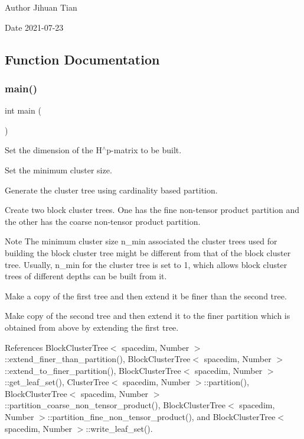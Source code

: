 \begin{DoxyAuthor}{Author}
Jihuan Tian 
\end{DoxyAuthor}
\begin{DoxyDate}{Date}
2021-\/07-\/23 
\end{DoxyDate}


\subsection{Function Documentation}
\mbox{\label{bct-extend-to-finer-partition_8cc_ae66f6b31b5ad750f1fe042a706a4e3d4}} 
\subsubsection{\texorpdfstring{main()}{main()}}
{\footnotesize\ttfamily int main (\begin{DoxyParamCaption}{ }\end{DoxyParamCaption})}

Set the dimension of the H$^\wedge$p-\/matrix to be built.

Set the minimum cluster size.

Generate the cluster tree using cardinality based partition.

Create two block cluster trees. One has the fine non-\/tensor product partition and the other has the coarse non-\/tensor product partition.


\begin{DoxyDescription}
\item[Note ]The minimum cluster size {\ttfamily n\+\_\+min} associated the cluster trees used for building the block cluster tree might be different from that of the block cluster tree. Usually, {\ttfamily n\+\_\+min} for the cluster tree is set to 1, which allows block cluster trees of different depths can be built from it. 
\end{DoxyDescription}

Make a copy of the first tree and then extend it be finer than the second tree.

Make copy of the second tree and then extend it to the finer partition which is obtained from above by extending the first tree.

References Block\+Cluster\+Tree$<$ spacedim, Number $>$\+::extend\+\_\+finer\+\_\+than\+\_\+partition(), Block\+Cluster\+Tree$<$ spacedim, Number $>$\+::extend\+\_\+to\+\_\+finer\+\_\+partition(), Block\+Cluster\+Tree$<$ spacedim, Number $>$\+::get\+\_\+leaf\+\_\+set(), Cluster\+Tree$<$ spacedim, Number $>$\+::partition(), Block\+Cluster\+Tree$<$ spacedim, Number $>$\+::partition\+\_\+coarse\+\_\+non\+\_\+tensor\+\_\+product(), Block\+Cluster\+Tree$<$ spacedim, Number $>$\+::partition\+\_\+fine\+\_\+non\+\_\+tensor\+\_\+product(), and Block\+Cluster\+Tree$<$ spacedim, Number $>$\+::write\+\_\+leaf\+\_\+set().

